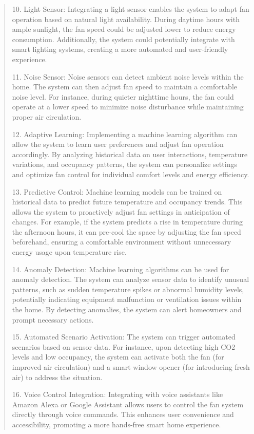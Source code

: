 \documentclass[12pt]{report}
\begin{document}
\begin{quote}
			10. Light Sensor:  Integrating a light sensor enables the system to adapt fan operation based on natural light availability. During daytime hours with ample sunlight, the fan speed could be adjusted lower to reduce energy consumption. Additionally, the  system could potentially integrate with smart lighting systems, creating a more automated and user-friendly experience.
			
			11. Noise Sensor: Noise sensors can detect ambient noise levels within the home. The system can then adjust fan speed to maintain a comfortable noise level. For instance, during quieter nighttime hours, the fan could operate at a lower speed to minimize noise disturbance while maintaining proper air circulation.
			
			12. Adaptive Learning: Implementing a machine learning algorithm can allow the system to learn user preferences and adjust fan operation accordingly. By analyzing historical data on user interactions, temperature variations, and occupancy patterns, the system can personalize settings and optimize fan control for individual comfort levels and energy efficiency.
			
			13. Predictive Control: Machine learning models can be trained on historical data to predict future temperature and occupancy trends. This allows the system to proactively adjust fan settings in anticipation of changes. For example, if the system predicts a rise in temperature during the afternoon hours, it can pre-cool the space by adjusting the fan speed beforehand, ensuring a comfortable environment without unnecessary energy usage upon temperature rise.
			
			14. Anomaly Detection: Machine learning algorithms can be used for anomaly detection. The system can analyze sensor data to identify unusual patterns, such as sudden temperature spikes or abnormal humidity levels, potentially indicating equipment malfunction or ventilation issues within the home. By detecting anomalies, the system can alert homeowners and prompt necessary actions.
			
			15. Automated Scenario Activation:  The system can trigger automated scenarios based on sensor data. For instance, upon detecting high CO2 levels and low occupancy, the system can activate both the fan (for improved air circulation) and a smart window opener (for introducing fresh air) to address the situation.
			
			16. Voice Control Integration: Integrating with voice assistants like Amazon Alexa or Google Assistant allows users to control the fan system directly through voice commands. This enhances user convenience and accessibility, promoting a more hands-free smart home experience.
			

\end{quote}
\end{document}

